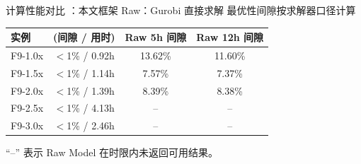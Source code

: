 \begin{frame}{计算性能对比}
\scriptsize
\algoNotation：本文框架 \quad Raw：Gurobi 直接求解 \quad 最优性间隙按求解器口径计算

\vspace{0.2cm}
\begin{block}{}
\centering
\small
\begin{tabular}{lccc}
\toprule
实例 & \algoNotation{} (间隙 / 用时) & Raw 5h 间隙 & Raw 12h 间隙 \\
\midrule
F9-1.0x & $<$1\% / 0.92h & 13.62\% & 11.60\% \\
F9-1.5x & $<$1\% / 1.14h & 7.57\% & 7.37\% \\
F9-2.0x & $<$1\% / 1.39h & 8.39\% & 8.38\% \\
F9-2.5x & $<$1\% / 4.13h & -- & -- \\
F9-3.0x & $<$1\% / 2.46h & -- & -- \\
\bottomrule
\end{tabular}
\vspace{0.1cm}

\scriptsize ``--'' 表示 Raw Model 在时限内未返回可用结果。
\end{block}

\vspace{0.2cm}
\end{frame}
